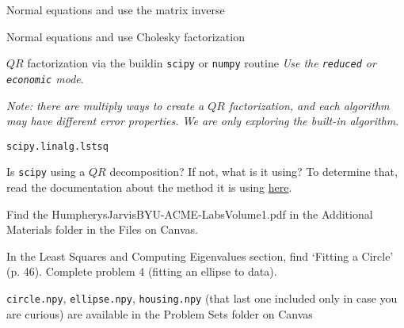 \documentclass[12pt,letterpaper,noanswers]{exam}
\newcommand{\vc}[1]{\boldsymbol{#1}}
\begin{document}
\begin{questions}
\begin{parts}


\item Normal equations and use the matrix inverse

\item Normal equations and use Cholesky factorization

\item $QR$ factorization via the buildin \texttt{scipy} or \texttt{numpy} routine \emph{Use the \texttt{reduced} or \texttt{economic} mode}.

\emph{Note: there are multiply ways to create a $QR$ factorization, and each algorithm may have different error properties.  We are only exploring the built-in algorithm}.

\item \texttt{scipy.linalg.lstsq}

Is \texttt{scipy} using a $QR$ decomposition?  If not, what is it using?  To determine that, read the documentation about the method it is using \href{https://netlib.org/lapack/explore-html/d7/d3b/group__double_g_esolve_ga94bd4a63a6dacf523e25ff617719f752.html#ga94bd4a63a6dacf523e25ff617719f752}{here}.


\end{parts}



\question Find the HumpherysJarvisBYU-ACME-LabsVolume1.pdf in the Additional Materials folder in the Files on Canvas.

In the Least Squares and Computing Eigenvalues section, find `Fitting a Circle' (p. 46).  Complete problem 4 (fitting an ellipse to data).

\texttt{circle.npy}, \texttt{ellipse.npy}, \texttt{housing.npy} (that last one included only in case you are curious) are available in the Problem Sets folder on Canvas










\end{questions}
\end{document}

